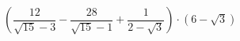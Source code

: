 \begin{ex}[type=calculate_expression]
	\begin{condition}
		\( \left( \dfrac{12}{\sqrt{15}-3}-\dfrac{28}{\sqrt{15}-1}+\dfrac{1}{2-\sqrt{3}} \right) \cdot (6-\sqrt{3}) \)
	\end{condition}
\end{ex}